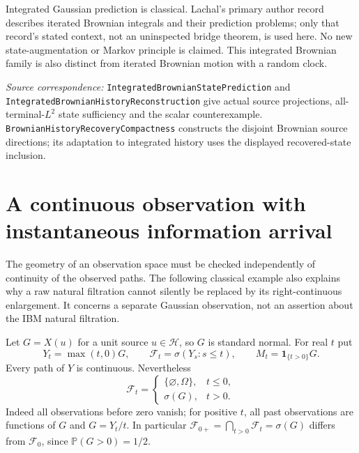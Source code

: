 \documentclass[11pt]{article}
\newcommand{\Hh}{\mathcal H}\newcommand{\U}{\mathcal U}
\newcommand{\code}[1]{{\small\nolinkurl{#1}}}
\begin{document}
Integrated Gaussian prediction is classical. Lachal's primary author
record \cite{Lachal} describes iterated Brownian integrals and their
prediction problems; only that record's stated context, not an
uninspected bridge theorem, is used here. No new state-augmentation
or Markov principle is claimed. This integrated Brownian family is
also distinct from iterated Brownian motion with a random clock.

\par\smallskip\begingroup\small\raggedright
\textit{Source correspondence:}
\code{IntegratedBrownianStatePrediction} and
\code{IntegratedBrownianHistoryReconstruction} give actual source
projections, all-terminal-$L^2$ state sufficiency and the scalar
counterexample. \code{BrownianHistoryRecoveryCompactness} constructs
the disjoint Brownian source directions; its adaptation to integrated
history uses the displayed recovered-state inclusion.
\par\endgroup

\section{A continuous observation with instantaneous information arrival}
The geometry of an observation space must be checked independently
of continuity of the observed paths. The following classical example
also explains why a raw natural filtration cannot silently be replaced
by its right-continuous enlargement. It concerns a separate Gaussian
observation, not an assertion about the IBM natural filtration.

Let $G=X(u)$ for a unit source $u\in\Hh$, so $G$ is standard normal.
For real $t$ put
\[
 Y_t=\max(t,0)G,\qquad
 \mathcal F_t=\sigma(Y_s:s\leq t),\qquad
 M_t=\mathbf1_{\{t>0\}}G.
\]
Every path of $Y$ is continuous. Nevertheless
\[
 \mathcal F_t=\begin{cases}\{\varnothing,\Omega\},&t\leq0,\\
 \sigma(G),&t>0.\end{cases}
\]
Indeed all observations before zero vanish; for positive $t$, all
past observations are functions of $G$ and $G=Y_t/t$. In particular
$\mathcal F_{0+}=\bigcap_{t>0}\mathcal F_t=\sigma(G)$ differs from
$\mathcal F_0$, since $\mathbb P(G>0)=1/2$.
\end{document}
